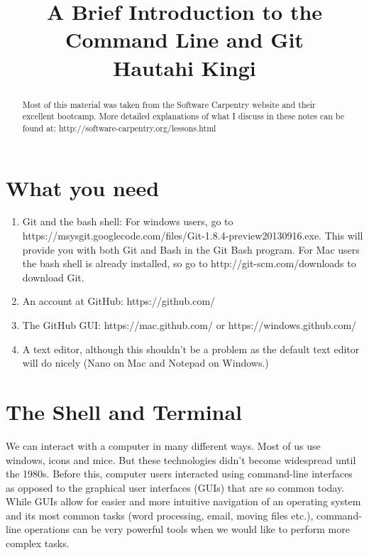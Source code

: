 \documentclass{article}
\title{
\vspace{2in}
\textmd{\textbf{A Brief Introduction to the Command Line and Git}}\\
\normalsize\vspace{0.1in}\small{Hautahi Kingi}\\
\vspace{0in}
}
\date{} %
\begin{document}
\maketitle

\begin{abstract}
Most of this material was taken from the Software Carpentry website and their excellent bootcamp. More detailed explanations of what I discuss in these notes can be found at: http://software-carpentry.org/lessons.html
\end{abstract}


\newpage

\section{What you need}

\begin{enumerate}
\item
Git and the bash shell: For windows users, go to https://msysgit.googlecode.com/files/Git-1.8.4-preview20130916.exe. This will provide you with both Git and Bash in the Git Bash program. For Mac users the bash shell is already installed, so go to http://git-scm.com/downloads to download Git.
\item
An account at GitHub: https://github.com/
\item
The GitHub GUI: https://mac.github.com/ or https://windows.github.com/
\item
A text editor, although this shouldn't be a problem as the default text editor will do nicely (Nano on Mac and Notepad on Windows.)
\end{enumerate}



\section{The Shell and Terminal}

We can interact with a computer in many different ways. Most of us use windows, icons and mice. But these technologies didn't become widespread until the 1980s. Before this, computer users interacted using command-line interfaces as opposed to the graphical user interfaces (GUIs) that are so common today. While GUIs allow for easier and more intuitive navigation of an operating system and its most common tasks (word processing, email, moving files etc.), command-line operations can be very powerful tools when we would like to perform more complex tasks.\\
\end{document}
